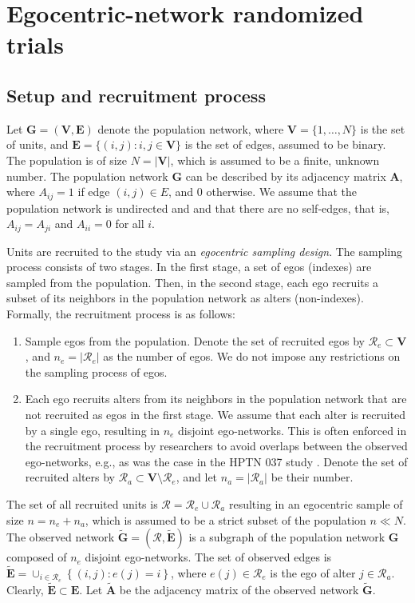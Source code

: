 \documentclass[11pt]{article}
\theoremstyle{definition}
\def \bA {\boldsymbol{A}}
\def \bG {\boldsymbol{G}}
\def \bE {\boldsymbol{E}}
\def \bV {\boldsymbol{V}}
\def \cR {\mathcal{R}}
\begin{document}
\section{Egocentric-network randomized trials}
\label{sec:egocentric_rct}
\subsection{Setup and recruitment process}
\label{subsec:recruitment}
Let $\bG = (\bV,\bE)$ denote the population network,
where $\bV = \{1,\ldots,N\}$ is the set of units, and $\bE = \{(i,j) : i,j \in \bV\}$ is the set of edges,
 assumed to be binary. 
The population is of size $N = \lvert \bV \rvert$, which is assumed to be a finite, unknown number.
The population network $\bG$ can be described by its adjacency matrix $\bA$,
where $A_{ij} = 1$ if edge $(i,j) \in E$, and $0$ otherwise.
We assume that the population network is undirected and and that there are no self-edges,
that is, $A_{ij} = A_{ji}$ and $A_{ii} = 0$ for all $i$. 

Units are recruited to the study via an \emph{egocentric sampling design}.
The sampling process consists of two stages. 
In the first stage, a set of egos (indexes) are sampled from the population.
Then, in the second stage, each ego recruits a subset of its neighbors in the population network as alters (non-indexes).
Formally, the recruitment process is as follows:
\begin{enumerate}
    \item Sample egos from the population.
    Denote the set of recruited egos by $\cR_e \subset \bV$, 
     and $n_e = \lvert \cR_e \rvert$ as the number of egos.
    We do not impose any restrictions on the sampling process of egos.
    \item Each ego recruits alters from its neighbors in the population network that are not recruited as egos in the first stage. 
    We assume that each alter is recruited by a single ego, resulting in $n_e$ disjoint ego-networks.
    This is often enforced in the recruitment process by researchers to avoid overlaps between the observed ego-networks,
    e.g., as was the case in the HPTN 037 study \citep{Latkin2009}.
    Denote the set of recruited alters by
    $\cR_a \subset \bV \setminus \cR_e$, 
    and let $n_a = \lvert \cR_a \rvert$ be their number.
\end{enumerate}
The set of all recruited units is $\cR = \cR_e \cup \cR_a$ resulting in 
an egocentric sample of size $n = n_e + n_a$,
which is assumed to be a strict subset of the population $n \ll N$.
The observed network $\widetilde{\bG} = (\cR, \widetilde{\bE})$ 
is a subgraph of the population network $\bG$ composed of $n_e$ disjoint ego-networks.
The set of observed edges is $\widetilde{\bE} = \cup_{i\in \cR_e} \left\{(i,j) : e(j) = i\right\}$,
where $e(j) \in \cR_e$ is the ego of alter $j \in \cR_a$.
Clearly, $\widetilde{\bE} \subset \bE$.
Let $\widetilde{\bA}$ be the adjacency matrix of the observed network $\widetilde{\bG}$.
\end{document}

